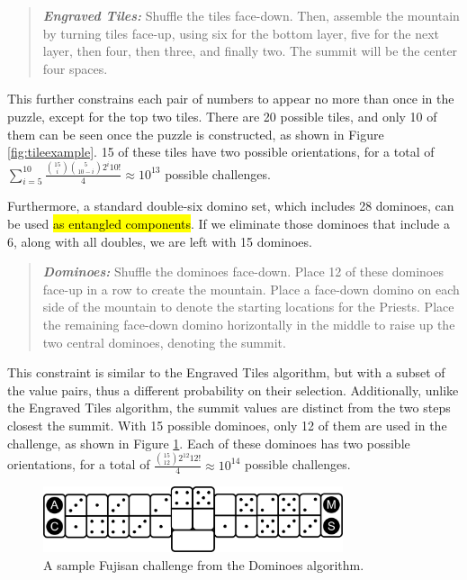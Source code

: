 \documentclass[journal]{IEEEtran}
\begin{document}
\begin{quote}
    
  {\it \bf Engraved Tiles:} Shuffle the tiles face-down. Then, assemble the mountain by turning tiles face-up, using six for the bottom layer, five for the next layer, then four, then three, and finally two. The summit will be the center four spaces.
\end{quote}

This further constrains each pair of numbers to appear no more than once in the puzzle, except for the top two tiles. There are 20 possible tiles, and only 10 of them can be seen once the puzzle is constructed, as shown in Figure \ref{fig:tileexample}. 15 of these tiles have two possible orientations, for a total of $\sum_{i = 5}^{10}\frac{{15 \choose i}\binom{5}{10 - i}2^{i}10!}{4} \approx 10^{13}
$ possible challenges.

Furthermore, a standard double-six domino set, which includes 28 dominoes, 
can be used \hl{as entangled components}. If we eliminate those dominoes that include a 6, along with all doubles, we are left with 15 dominoes. 

\begin{quote}
    
  {\it \bf Dominoes:} Shuffle the dominoes face-down. Place 12 of these dominoes face-up in a row to create the mountain. Place a face-down domino on each side of the mountain to denote the starting locations for the Priests. Place the remaining face-down domino horizontally in the middle to raise up the two central dominoes, denoting the summit.
\end{quote}

This constraint is similar to the Engraved Tiles algorithm, but with a subset of the value pairs, thus a different probability on their selection.  Additionally, unlike the Engraved Tiles algorithm, the summit values are distinct from the two steps closest the summit.
With 15 possible dominoes, only 12 of them are used in the challenge, as shown in Figure \ref{fig:dominoexample}. Each of these dominoes has two possible orientations, for a total of $\frac{{15 \choose 12}2^{12}12!}{4} \approx 10^{14}$ possible challenges. 

\begin{figure}[b]
\includegraphics[width=8.8cm]{dominoexample.png}
\caption{A sample Fujisan challenge from the Dominoes algorithm.}
\label{fig:dominoexample}
\end{figure}
\end{document}
